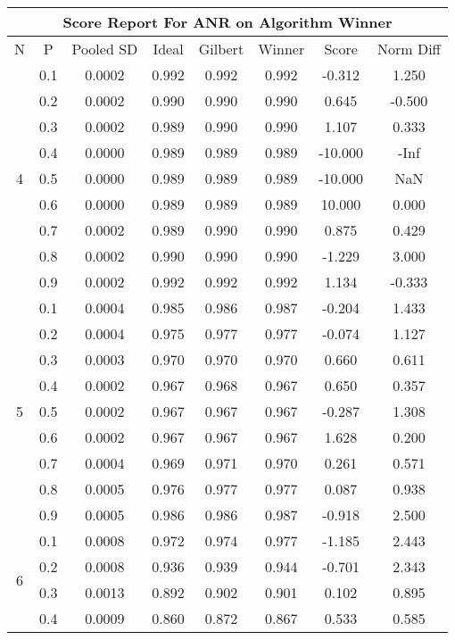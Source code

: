 \documentclass[11pt,a4paper]{report}
\begin{document}
\begin{longtable}{ | c | c || c | c | c | c | c | c | }
\hline
\multicolumn{8}{|c|}{ Score Report For ANR on Algorithm Winner} \\
\hline
N & P & Pooled SD &  Ideal &  Gilbert & Winner  & Score & Norm Diff \\
 \hline
 \hline
 \endhead
\multirow{9}{*}{4} & 0.1 & 0.0002 & 0.992 & 0.992 & 0.992 & -0.312 & 1.250 \\
 & 0.2 & 0.0002 & 0.990 & 0.990 & 0.990 & 0.645 & -0.500 \\
 & 0.3 & 0.0002 & 0.989 & 0.990 & 0.990 & 1.107 & 0.333 \\
 & 0.4 & 0.0000 & 0.989 & 0.989 & 0.989 & -10.000 & -Inf \\
 & 0.5 & 0.0000 & 0.989 & 0.989 & 0.989 & -10.000 & NaN \\
 & 0.6 & 0.0000 & 0.989 & 0.989 & 0.989 & 10.000 & 0.000 \\
 & 0.7 & 0.0002 & 0.989 & 0.990 & 0.990 & 0.875 & 0.429 \\
 & 0.8 & 0.0002 & 0.990 & 0.990 & 0.990 & -1.229 & 3.000 \\
 & 0.9 & 0.0002 & 0.992 & 0.992 & 0.992 & 1.134 & -0.333 \\
 \hline
\multirow{9}{*}{5} & 0.1 & 0.0004 & 0.985 & 0.986 & 0.987 & -0.204 & 1.433 \\
 & 0.2 & 0.0004 & 0.975 & 0.977 & 0.977 & -0.074 & 1.127 \\
 & 0.3 & 0.0003 & 0.970 & 0.970 & 0.970 & 0.660 & 0.611 \\
 & 0.4 & 0.0002 & 0.967 & 0.968 & 0.967 & 0.650 & 0.357 \\
 & 0.5 & 0.0002 & 0.967 & 0.967 & 0.967 & -0.287 & 1.308 \\
 & 0.6 & 0.0002 & 0.967 & 0.967 & 0.967 & 1.628 & 0.200 \\
 & 0.7 & 0.0004 & 0.969 & 0.971 & 0.970 & 0.261 & 0.571 \\
 & 0.8 & 0.0005 & 0.976 & 0.977 & 0.977 & 0.087 & 0.938 \\
 & 0.9 & 0.0005 & 0.986 & 0.986 & 0.987 & -0.918 & 2.500 \\
 \hline
\multirow{9}{*}{6} & 0.1 & 0.0008 & 0.972 & 0.974 & 0.977 & -1.185 & 2.443 \\
 & 0.2 & 0.0008 & 0.936 & 0.939 & 0.944 & -0.701 & 2.343 \\
 & 0.3 & 0.0013 & 0.892 & 0.902 & 0.901 & 0.102 & 0.895 \\
 & 0.4 & 0.0009 & 0.860 & 0.872 & 0.867 & 0.533 & 0.585 \\

\end{longtable}
\end{document}
